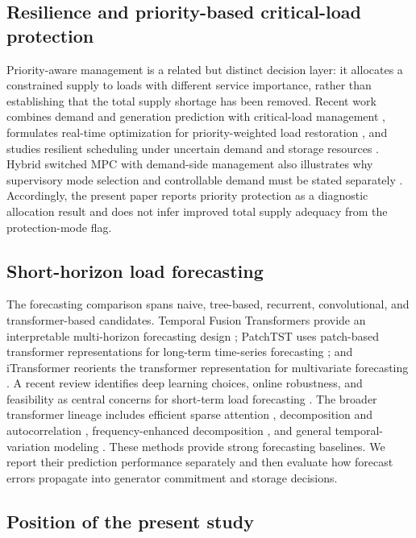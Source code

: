 \subsection{Resilience and priority-based critical-load protection}

Priority-aware management is a related but distinct decision layer: it
allocates a constrained supply to loads with different service importance,
rather than establishing that the total supply shortage has been removed.
Recent work combines demand and generation prediction with critical-load
management \citep{esmaeili2023critical}, formulates real-time optimization
for priority-weighted load restoration \citep{erenoglu2023restoration}, and
studies resilient scheduling under uncertain demand and storage resources
\citep{niknami2024resilient}. Hybrid switched MPC with demand-side management
also illustrates why supervisory mode selection and controllable demand must
be stated separately \citep{maslak2024switchedmpc}. Accordingly, the present
paper reports priority protection as a diagnostic allocation result and does
not infer improved total supply adequacy from the protection-mode flag.

\subsection{Short-horizon load forecasting}

The forecasting comparison spans naive, tree-based, recurrent,
convolutional, and transformer-based candidates. Temporal Fusion
Transformers provide an interpretable multi-horizon forecasting design
\citep{lim2021tft}; PatchTST uses patch-based transformer representations
for long-term time-series forecasting \citep{nie2023patchtst}; and
iTransformer reorients the transformer representation for multivariate
forecasting \citep{liu2024itransformer}. A recent review identifies deep
learning choices, online robustness, and feasibility as central concerns for
short-term load forecasting \citep{eren2024stlfreview}. The broader
transformer lineage includes efficient sparse attention
\citep{zhou2021informer}, decomposition and autocorrelation
\citep{wu2021autoformer}, frequency-enhanced decomposition
\citep{zhou2022fedformer}, and general temporal-variation modeling
\citep{wu2023timesnet}. These methods provide strong forecasting baselines.
We report their prediction performance separately and then evaluate how
forecast errors propagate into generator commitment and storage decisions.

\subsection{Position of the present study}

